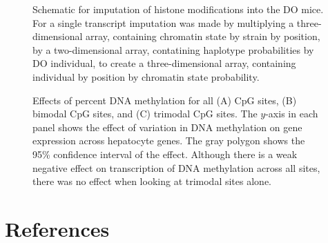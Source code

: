 \documentclass[10pt,letterpaper]{article}
\begin{document}
\begin{figure}[ht]
\centering
\caption{Schematic for imputation of histone modifications into the 
DO mice. For a single transcript imputation was made by multiplying 
a three-dimensional array, containing chromatin state by strain by
position, by a two-dimensional array, contatining haplotype probabilities
by DO individual, to create a three-dimensional array, containing 
individual by position by chromatin state probability.}
\label{supp_fig:imputation}
\end{figure}

\begin{figure}[ht]
\centering
\caption{Effects of percent DNA methylation for all (A) CpG sites,
(B) bimodal CpG sites, and (C) trimodal CpG sites. The $y$-axis
in each panel shows the effect of variation in DNA methylation on 
gene expression across hepatocyte genes. The gray polygon shows the
95\% confidence interval of the effect. Although there is a weak
negative effect on transcription of DNA methylation across all 
sites, there was no effect when looking at trimodal sites alone.}
\label{supp_fig:trimodal}
\end{figure}

\pagebreak

\hypertarget{references}{%
\section*{References}\label{references}}
\end{document}

